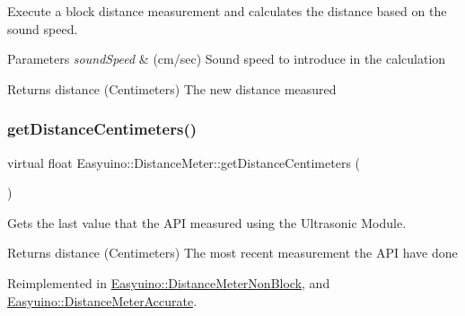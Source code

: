 Execute a block distance measurement and calculates the distance based on the sound speed. 


\begin{DoxyParams}{Parameters}
{\em sound\+Speed} & (cm/sec) Sound speed to introduce in the calculation \\
\hline
\end{DoxyParams}
\begin{DoxyReturn}{Returns}
distance (Centimeters) The new distance measured 
\end{DoxyReturn}
\mbox{\label{class_easyuino_1_1_distance_meter_a637cdd0d3e4f3bcf094704ae91e0c7c3}} 
\subsubsection{\texorpdfstring{get\+Distance\+Centimeters()}{getDistanceCentimeters()}}
{\footnotesize\ttfamily virtual float Easyuino\+::\+Distance\+Meter\+::get\+Distance\+Centimeters (\begin{DoxyParamCaption}{ }\end{DoxyParamCaption})\hspace{0.3cm}{\ttfamily [virtual]}}



Gets the last value that the A\+PI measured using the Ultrasonic Module. 

\begin{DoxyReturn}{Returns}
distance (Centimeters) The most recent measurement the A\+PI have done 
\end{DoxyReturn}


Reimplemented in \hyperlink{class_easyuino_1_1_distance_meter_non_block_a00419fc2c2ff7c587735063971aa7464}{Easyuino\+::\+Distance\+Meter\+Non\+Block}, and \hyperlink{class_easyuino_1_1_distance_meter_accurate_a4de44a347db0bebbf5d74f12397cd4d9}{Easyuino\+::\+Distance\+Meter\+Accurate}.

\mbox{\label{class_easyuino_1_1_distance_meter_a4e3c650c54382d9af6bca51dcac4e7a3}} 

